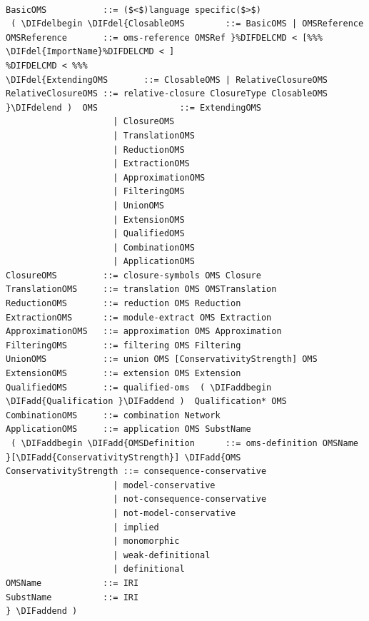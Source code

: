 \documentclass[10pt,fleqn,final]{scrreprt}
\providecommand{\DIFadd}[1]{{\protect\color{blue}\uwave{#1}}} %
\providecommand{\DIFdel}[1]{{\protect\color{red}\sout{#1}}}                      %
\providecommand{\DIFaddbegin}{} %
\providecommand{\DIFaddend}{} %
\providecommand{\DIFdelbegin}{} %
\providecommand{\DIFdelend}{} %
\begin{document}
\begin{lstlisting}[language=ebnf,escapeinside={()}]  % abstract syntax

BasicOMS           ::= ($<$)language specific($>$) 
 ( \DIFdelbegin \DIFdel{ClosableOMS        ::= BasicOMS | OMSReference
OMSReference       ::= oms-reference OMSRef }%DIFDELCMD < [%%%
\DIFdel{ImportName}%DIFDELCMD < ]
%DIFDELCMD < %%%
\DIFdel{ExtendingOMS       ::= ClosableOMS | RelativeClosureOMS
RelativeClosureOMS ::= relative-closure ClosureType ClosableOMS
}\DIFdelend )  OMS                ::= ExtendingOMS
                     | ClosureOMS
                     | TranslationOMS
                     | ReductionOMS
                     | ExtractionOMS
                     | ApproximationOMS
                     | FilteringOMS
                     | UnionOMS
                     | ExtensionOMS
                     | QualifiedOMS
                     | CombinationOMS
                     | ApplicationOMS
ClosureOMS         ::= closure-symbols OMS Closure
TranslationOMS     ::= translation OMS OMSTranslation
ReductionOMS       ::= reduction OMS Reduction
ExtractionOMS      ::= module-extract OMS Extraction
ApproximationOMS   ::= approximation OMS Approximation
FilteringOMS       ::= filtering OMS Filtering
UnionOMS           ::= union OMS [ConservativityStrength] OMS
ExtensionOMS       ::= extension OMS Extension
QualifiedOMS       ::= qualified-oms  ( \DIFaddbegin \DIFadd{Qualification }\DIFaddend )  Qualification* OMS
CombinationOMS     ::= combination Network
ApplicationOMS     ::= application OMS SubstName
 ( \DIFaddbegin \DIFadd{OMSDefinition      ::= oms-definition OMSName }[\DIFadd{ConservativityStrength}] \DIFadd{OMS
ConservativityStrength ::= consequence-conservative
                     | model-conservative
                     | not-consequence-conservative
                     | not-model-conservative
                     | implied
                     | monomorphic
                     | weak-definitional
                     | definitional
OMSName            ::= IRI
SubstName          ::= IRI
} \DIFaddend )
\end{lstlisting}
\end{document}
